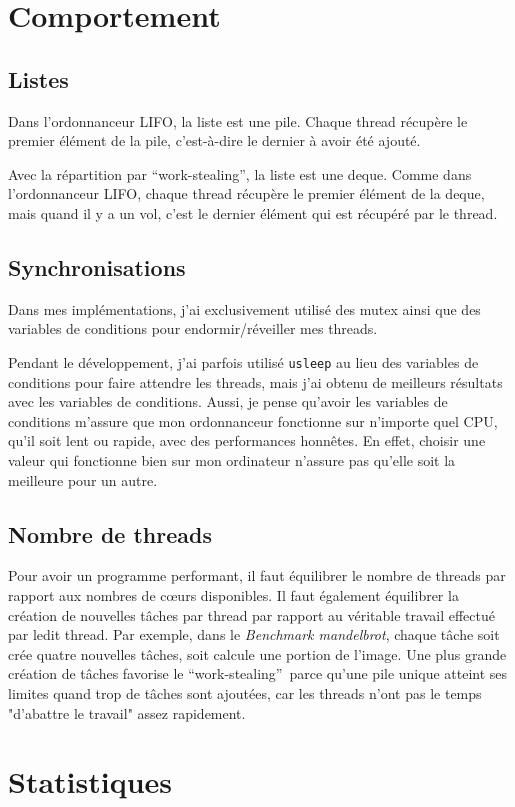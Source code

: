 \documentclass[a4paper]{article}
\def\coeur{c\oe{}ur}
\def\btwo{\textit{Benchmark mandelbrot}}
\def\ws{\enquote{work-stealing}}
\begin{document}
\section{Comportement}

\subsection{Listes}
Dans l'ordonnanceur LIFO, la liste est une pile. Chaque thread récupère le
premier élément de la pile, c'est-à-dire le dernier à avoir été ajouté.

Avec la répartition par \ws, la liste est une deque. Comme dans l'ordonnanceur
LIFO, chaque thread récupère le premier élément de la deque, mais quand il y a
un vol, c'est le dernier élément qui est récupéré par le thread.

\subsection{Synchronisations}
Dans mes implémentations, j'ai exclusivement utilisé des mutex ainsi que des
variables de conditions pour endormir/réveiller mes threads.

Pendant le développement, j'ai parfois utilisé \texttt{usleep} au lieu des
variables de conditions pour faire attendre les threads, mais j'ai obtenu de
meilleurs résultats avec les variables de conditions. Aussi, je pense qu'avoir
les variables de conditions m'assure que mon ordonnanceur fonctionne sur
n'importe quel CPU, qu'il soit lent ou rapide, avec des performances honnêtes.
En effet, choisir une valeur qui fonctionne bien sur mon ordinateur n'assure pas
qu'elle soit la meilleure pour un autre.

\subsection{Nombre de threads}
Pour avoir un programme performant, il faut équilibrer le nombre de threads par
rapport aux nombres de \coeur{}s disponibles. Il faut également équilibrer la
création de nouvelles tâches par thread par rapport au véritable travail
effectué par ledit thread. Par exemple, dans le \btwo, chaque tâche soit crée
quatre nouvelles tâches, soit calcule une portion de l'image. Une plus grande
création de tâches favorise le \ws~parce qu'une pile unique atteint ses limites
quand trop de tâches sont ajoutées, car les threads n'ont pas le temps
"d'abattre le travail" assez rapidement.

\section{Statistiques}
\end{document}
